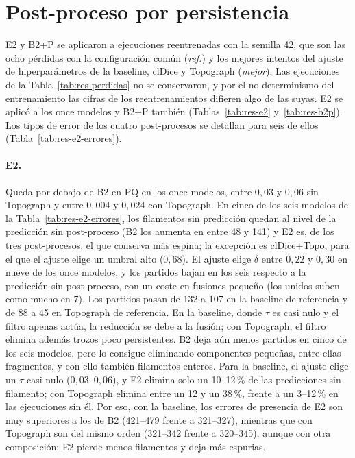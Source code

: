 \section{Post-proceso por persistencia}
\label{sec:anx-e2}

E2 y B2+P se aplicaron a ejecuciones reentrenadas con la semilla 42, que son las
ocho pérdidas con la configuración común (\emph{ref.}) y los mejores
intentos del ajuste de hiperparámetros de la baseline, clDice y
Topograph (\emph{mejor}). Las ejecuciones de la Tabla~\ref{tab:res-perdidas}
no se conservaron, y por el no determinismo del entrenamiento las cifras
de los reentrenamientos difieren algo de las suyas. E2 se aplicó a los
once modelos y B2+P también (Tablas~\ref{tab:res-e2}
y~\ref{tab:res-b2p}). Los tipos de error de los cuatro post-procesos se
detallan para seis de ellos (Tabla~\ref{tab:res-e2-errores}).

\paragraph{E2.} Queda por debajo de B2 en PQ en los once modelos, entre
$0{,}03$ y $0{,}06$ sin Topograph y entre $0{,}004$ y $0{,}024$ con
Topograph. En cinco de los seis modelos de la
Tabla~\ref{tab:res-e2-errores}, los filamentos sin predicción quedan al
nivel de la predicción sin post-proceso (B2 los aumenta en entre 48 y
141) y E2 es, de los tres
post-procesos, el que conserva más espina; la excepción es clDice+Topo,
para el que el ajuste elige un umbral alto ($0{,}68$). El ajuste elige
$\delta$ entre $0{,}22$ y $0{,}30$ en nueve de los once modelos, y los
partidos bajan en los seis respecto a la predicción sin post-proceso,
con un coste en fusiones pequeño (los unidos suben como mucho en 7). Los partidos pasan
de 132 a 107 en la baseline de referencia y de 88 a 45 en Topograph de
referencia. En la baseline, donde $\tau$ es casi nulo y el filtro apenas
actúa, la reducción se debe a la fusión; con Topograph, el filtro
elimina además trozos poco persistentes. B2 deja aún menos partidos en
cinco de los seis modelos, pero lo consigue eliminando componentes
pequeñas, entre ellas fragmentos, y con ello también filamentos
enteros.
Para la baseline, el ajuste elige un $\tau$ casi nulo
($0{,}03$--$0{,}06$), y E2 elimina solo un 10--12\,\% de las
predicciones sin filamento; con Topograph elimina entre un 12 y un
38\,\%, frente a un 3--12\,\% en las ejecuciones sin él. Por eso, con la baseline, los errores de presencia
de E2 son muy superiores a los de B2 (421--479 frente a 321--327),
mientras que con Topograph son del mismo orden (321--342 frente a
320--345), aunque con otra composición: E2 pierde menos filamentos y
deja más espurias.

